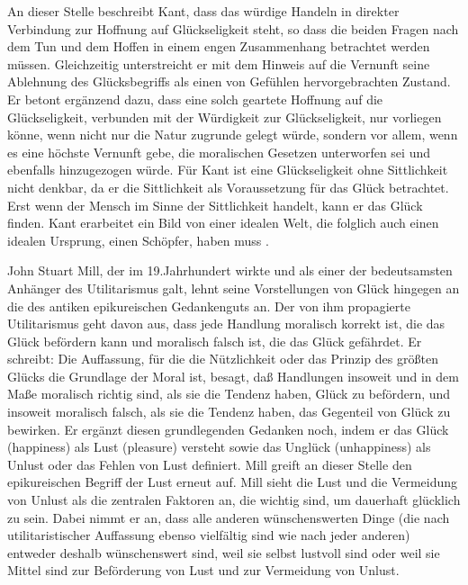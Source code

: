 An dieser Stelle beschreibt Kant, dass das würdige Handeln in direkter Verbindung zur Hoffnung auf Glückseligkeit steht, so dass die beiden Fragen nach dem Tun und dem Hoffen in einem engen Zusammenhang betrachtet werden müssen. 
Gleichzeitig unterstreicht er mit dem Hinweis auf die Vernunft seine Ablehnung des Glücksbegriffs als einen von Gefühlen hervorgebrachten Zustand. 
Er betont ergänzend dazu, dass eine solch geartete Hoffnung auf die Glückseligkeit, verbunden mit der Würdigkeit zur Glückseligkeit, nur vorliegen könne, wenn nicht nur die Natur zugrunde gelegt würde, sondern vor allem, wenn es eine höchste Vernunft gebe, die moralischen Gesetzen unterworfen sei und ebenfalls hinzugezogen würde.
Für Kant ist eine Glückseligkeit ohne Sittlichkeit nicht denkbar, da er die Sittlichkeit als Voraussetzung für das Glück betrachtet. 
Erst wenn der Mensch im Sinne der Sittlichkeit handelt, kann er das Glück finden. 
Kant erarbeitet ein Bild von einer idealen Welt, die folglich auch einen idealen Ursprung, einen Schöpfer, haben muss \cite[S.\,526]{IK73}.

John Stuart Mill, der im 19.Jahrhundert wirkte und als einer der bedeutsamsten Anhänger des Utilitarismus galt, lehnt seine Vorstellungen von Glück hingegen an die des antiken epikureischen Gedankenguts an. 
Der von ihm propagierte Utilitarismus geht davon aus, dass jede Handlung moralisch korrekt ist, die das Glück befördern kann und moralisch falsch ist, die das Glück gefährdet. 
Er schreibt: \glqq Die Auffassung, für die die Nützlichkeit oder das Prinzip des größten Glücks die Grundlage der Moral ist, besagt, daß Handlungen insoweit und in dem Maße moralisch richtig sind, als sie die Tendenz haben, Glück zu befördern, und insoweit moralisch falsch, als sie die Tendenz haben, das Gegenteil von Glück zu bewirken.\grqq{} \cite[S.\,13]{JM94}
Er ergänzt diesen grundlegenden Gedanken noch, indem er das Glück (happiness) als Lust (pleasure) versteht sowie das Unglück (unhappiness) als Unlust oder das Fehlen von Lust definiert. 
Mill greift an dieser Stelle den epikureischen Begriff der \glqq Lust\grqq{} erneut auf. 
Mill sieht die Lust und die Vermeidung von Unlust als die zentralen Faktoren an, die wichtig sind, um dauerhaft glücklich zu sein. 
Dabei nimmt er an, dass \glqq alle anderen wünschenswerten Dinge (die nach utilitaristischer Auffassung ebenso vielfältig sind wie nach jeder anderen) entweder deshalb wünschenswert sind, weil sie selbst lustvoll sind oder weil sie Mittel sind zur Beförderung von Lust und zur Vermeidung von Unlust.\grqq{} \cite[S.\,13]{JM94}

